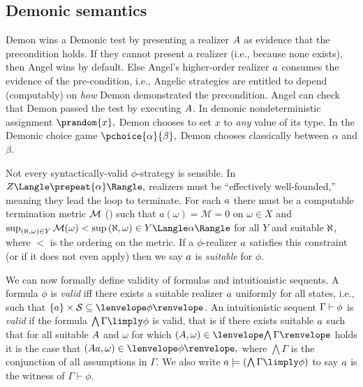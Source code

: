 \documentclass[12pt]{cmuthesis}
\theoremstyle{definition}
\theoremstyle{remark}
\newcommand{\rref}[2][]{\prettyref{#2}}
\newcommand{\allstate}{\mathcal{S}}
\newcommand{\om}{\omega}
\newcommand{\G}{\Gamma}
\begin{document}
\subsection{Demonic semantics}
Demon wins a Demonic test by presenting a realizer $\ab$ as evidence that the precondition holds.
If they cannot present a realizer (i.e., because none exists), then Angel wins by default.
Else Angel's higher-order realizer $\aa$ consumes the evidence of the pre-condition, i.e., Angelic strategies are entitled to depend (computably) on \emph{how} Demon demonstrated the precondition.
Angel can check that Demon passed the test by executing $\ab$.
In demonic nondeterministic assignment $\prandom{x},$ Demon chooses to set $x$ to \emph{any} value of its type.
In the Demonic choice game $\pchoice{\alpha}{\beta},$ Demon chooses classically between $\alpha$ and $\beta$.

Not every syntactically-valid $\phi$-strategy is sensible.
In $\strategyforR[\prepeat{\alpha}]{Z},$ realizers must be ``effectively well-founded,'' meaning they lead the loop to terminate.
For each $\aa$ there must be a computable termination metric $\met$ (\rref{def:poly-metric}) such that $a(\om) = \mathcal{M}=0$ on $\om \in X$ and 
$\sup_{(\ac,\om) \in Y}\mathcal{M}(\om) < \sup{(\ac,\om) \in \strategyforR[\alpha]{Y}}$ for all $Y$ and suitable $\ac$, where $<$ is the ordering on the metric.
If a $\phi$-realizer $\aa$ satisfies this constraint (or if it does not even apply) then we say $\aa$ is \emph{suitable} for $\phi$.

We can now formally define validity of formulas and intuitionistic sequents.
A formula $\phi$ is \emph{valid} iff there exists a suitable realizer $\aa$ uniformly for all states, i.e., such that  $\{\aa\} \times \allstate \subseteq \fintR{\phi}$.
An intuitionistic sequent $\seq{\G}{\phi}$ is \emph{valid} if the formula $\bigwedge \G \limply \phi$ is valid, 
that is if there exists suitable $\aa$ such that for all suitable $\ab$ and $\om$ for which $(\ab,\om) \in \cintR{\G}$ holds it is the case that
$(\rzApp{\ab}{\aa},\om) \in \fintR{\phi},$ where $\bigwedge \G$ is the conjunction of all assumptions in $\G$.
We also write $\aa \models (\bigwedge \G \limply \phi)$ to say $\aa$ is the witness of $\G \vdash \phi$.
\end{document}
